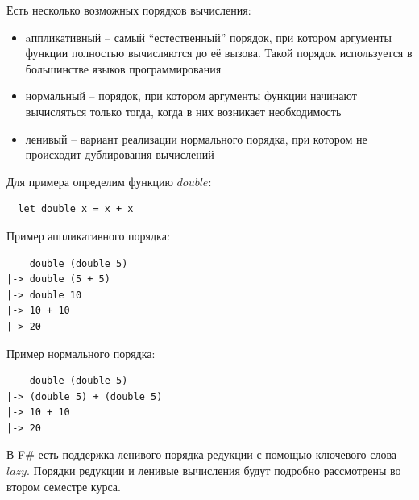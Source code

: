\documentclass[a4paper,11pt]{article}
\begin{document}
Есть несколько возможных порядков вычисления:
\begin{itemize}
\item aппликативный -- самый ``естественный'' порядок, при котором аргументы
функции полностью вычисляются до её вызова. Такой порядок используется в
большинстве языков программирования
\item нормальный -- порядок, при котором аргументы функции начинают вычисляться
только тогда, когда в них возникает необходимость
\item ленивый -- вариант реализации нормального порядка, при котором не
происходит дублирования вычислений
\end{itemize}

Для примера определим функцию $double$:
\begin{lstlisting}
  let double x = x + x
\end{lstlisting}

Пример аппликативного порядка:
\begin{lstlisting}
    double (double 5)
|-> double (5 + 5)
|-> double 10
|-> 10 + 10
|-> 20
\end{lstlisting}

Пример нормального порядка:
\begin{lstlisting}
    double (double 5)
|-> (double 5) + (double 5)
|-> 10 + 10
|-> 20
\end{lstlisting}

В F\# есть поддержка ленивого порядка редукции с помощью ключевого слова $lazy$.
Порядки редукции и ленивые вычисления будут подробно рассмотрены во втором
семестре курса.

\nocite{*}


\end{document}
